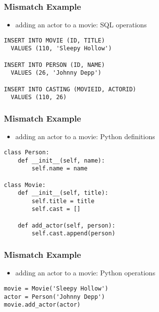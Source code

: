 \documentclass[dvipsnames]{beamer}
\theoremstyle{plain}
\begin{document}
\begin{frame}[fragile]
  \frametitle{Mismatch Example}

  \begin{itemize}
    \item adding an actor to a movie: SQL operations
  \end{itemize}

  \begin{lstlisting}[language=FullSQL]
INSERT INTO MOVIE (ID, TITLE)
  VALUES (110, 'Sleepy Hollow')

INSERT INTO PERSON (ID, NAME)
  VALUES (26, 'Johnny Depp')

INSERT INTO CASTING (MOVIEID, ACTORID)
  VALUES (110, 26)
  \end{lstlisting}
\end{frame}

\begin{frame}[fragile]
  \frametitle{Mismatch Example}

  \begin{itemize}
    \item adding an actor to a movie: Python definitions
  \end{itemize}

  \begin{lstlisting}
class Person:
    def __init__(self, name):
        self.name = name

class Movie:
    def __init__(self, title):
        self.title = title
        self.cast = []

    def add_actor(self, person):
        self.cast.append(person)
  \end{lstlisting}
\end{frame}

\begin{frame}[fragile]
  \frametitle{Mismatch Example}

  \begin{itemize}
    \item adding an actor to a movie: Python operations
  \end{itemize}

  \begin{lstlisting}
movie = Movie('Sleepy Hollow')
actor = Person('Johnny Depp')
movie.add_actor(actor)
  \end{lstlisting}
\end{frame}
\end{document}
